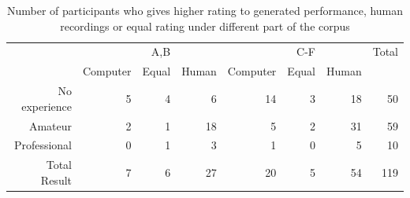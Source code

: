 \begin{table}
   \centering
   \caption{Number of participants who gives higher rating to generated performance, human recordings or equal rating under different part of the corpus}
   \label{tab:good-bad_count}
   \begin{tabular}{r|rrr|rrr|r}
\hline
&&A,B&&&C-F&&Total\\
&Computer&Equal&Human&Computer&Equal&Human&\\
      \hline
No experience&5&4&6&14&3&18&50\\
Amateur&2&1&18&5&2&31&59\\
Professional&0&1&3&1&0&5&10\\
      \hline
Total Result&7&6&27&20&5&54&119\\
      \hline
   \end{tabular}
\end{table}


